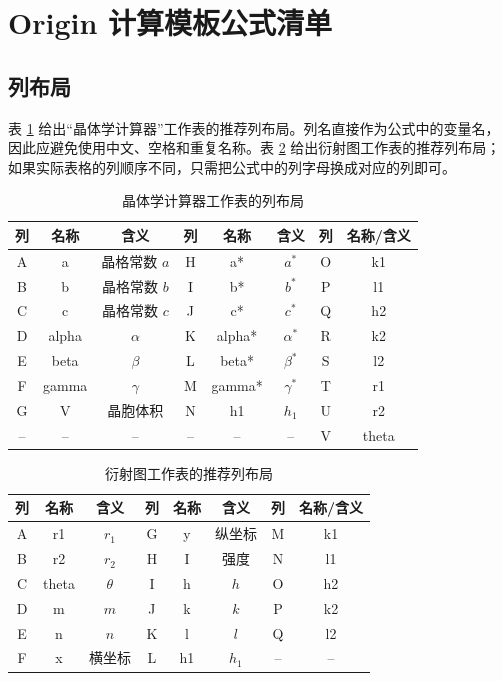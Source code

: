 \section{Origin 计算模板公式清单}

\subsection{列布局}

表 \ref{tab:calc-columns} 给出“晶体学计算器”工作表的推荐列布局。列名直接作为公式中的变量名，因此应避免使用中文、空格和重复名称。表 \ref{tab:diff-columns} 给出衍射图工作表的推荐列布局；如果实际表格的列顺序不同，只需把公式中的列字母换成对应的列即可。

\begin{table}[H]
  \centering
  \caption{晶体学计算器工作表的列布局}
  \label{tab:calc-columns}
  \small
  \setlength{\tabcolsep}{4pt}
  \begin{tabular}{cccccccc}
    \toprule
    列 & 名称 & 含义 & 列 & 名称 & 含义 & 列 & 名称/含义 \\
    \midrule
    A & a & 晶格常数 $a$ & H & a* & $a^*$ & O & k1 \\
    B & b & 晶格常数 $b$ & I & b* & $b^*$ & P & l1 \\
    C & c & 晶格常数 $c$ & J & c* & $c^*$ & Q & h2 \\
    D & alpha & $\alpha$ & K & alpha* & $\alpha^*$ & R & k2 \\
    E & beta & $\beta$ & L & beta* & $\beta^*$ & S & l2 \\
    F & gamma & $\gamma$ & M & gamma* & $\gamma^*$ & T & r1 \\
    G & V & 晶胞体积 & N & h1 & $h_1$ & U & r2 \\
    -- & -- & -- & -- & -- & -- & V & theta \\
    \bottomrule
  \end{tabular}
\end{table}

\begin{table}[H]
  \centering
  \caption{衍射图工作表的推荐列布局}
  \label{tab:diff-columns}
  \small
  \setlength{\tabcolsep}{4pt}
  \begin{tabular}{cccccccc}
    \toprule
    列 & 名称 & 含义 & 列 & 名称 & 含义 & 列 & 名称/含义 \\
    \midrule
    A & r1 & $r_1$ & G & y & 纵坐标 & M & k1 \\
    B & r2 & $r_2$ & H & I & 强度 & N & l1 \\
    C & theta & $\theta$ & I & h & $h$ & O & h2 \\
    D & m & $m$ & J & k & $k$ & P & k2 \\
    E & n & $n$ & K & l & $l$ & Q & l2 \\
    F & x & 横坐标 & L & h1 & $h_1$ & -- & -- \\
    \bottomrule
  \end{tabular}
\end{table}

